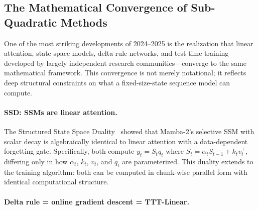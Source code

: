 \subsection{The Mathematical Convergence of Sub-Quadratic Methods}
\label{subsec:convergence}

One of the most striking developments of 2024--2025 is the realization that linear attention, state space models, delta-rule networks, and test-time training---developed by largely independent research communities---converge to the same mathematical framework. This convergence is not merely notational; it reflects deep structural constraints on what a fixed-size-state sequence model can compute.

\paragraph{SSD: SSMs are linear attention.}
The Structured State Space Duality~\cite{dao2024transformers} showed that Mamba-2's selective SSM with scalar decay is algebraically identical to linear attention with a data-dependent forgetting gate. Specifically, both compute $y_t = S_t q_t$ where $S_t = \alpha_t S_{t-1} + k_t v_t^\top$, differing only in how $\alpha_t$, $k_t$, $v_t$, and $q_t$ are parameterized. This duality extends to the training algorithm: both can be computed in chunk-wise parallel form with identical computational structure.

\paragraph{Delta rule = online gradient descent = TTT-Linear.}
